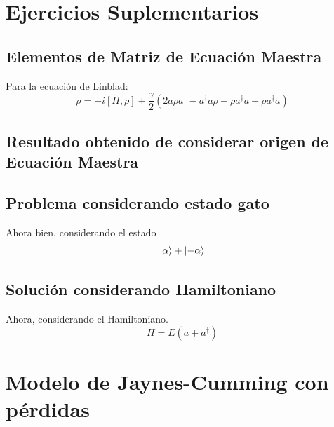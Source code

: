 \documentclass{book}
\begin{document}
\section{{Ejercicios Suplementarios}}
\subsection{{Elementos de Matriz de Ecuación Maestra}}
Para la ecuación de Linblad:
\begin{equation}\label{eq4}{\dot{\rho}=-i[H,\rho]+\frac{\gamma}{2}(2a\rho a ^\dag-a^\dag a\rho-\rho a^\dag a-\rho a^\dag a)}\end{equation}
\subsection{{Resultado obtenido de considerar origen de Ecuación Maestra}}
\subsection{{Problema considerando estado gato}}
Ahora bien, considerando el estado 
\begin{equation}{\ket{\alpha}+\ket{-\alpha}}\end{equation}
\subsection{{Solución considerando Hamiltoniano}}
Ahora, considerando el Hamiltoniano.
\begin{equation}{H=E(a+a^\dag)}\end{equation}

\section{{Modelo de Jaynes-Cumming con pérdidas}}
\end{document}
